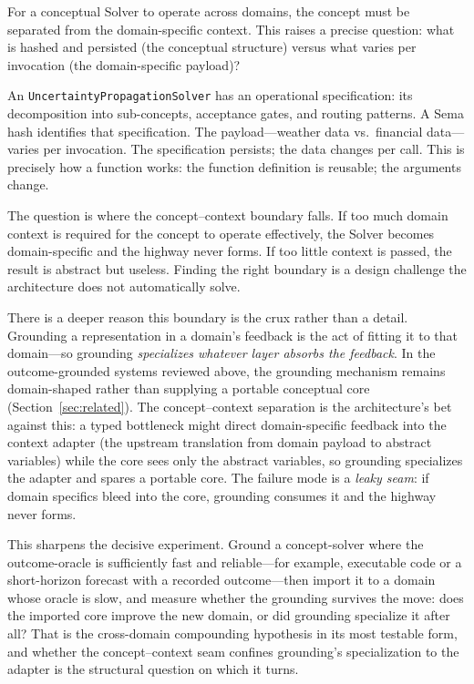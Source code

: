 \documentclass[11pt]{article}
\let\oldtexttt\texttt
\renewcommand{\texttt}[1]{\oldtexttt{\small #1}}
\begin{document}
For a conceptual Solver to operate across domains, the concept must be separated from the domain-specific context. This raises a precise question: what is hashed and persisted (the conceptual structure) versus what varies per invocation (the domain-specific payload)?

An \texttt{UncertaintyPropagationSolver} has an operational specification: its decomposition into sub-concepts, acceptance gates, and routing patterns. A Sema hash identifies that specification. The payload---weather data vs.\ financial data---varies per invocation. The specification persists; the data changes per call. This is precisely how a function works: the function definition is reusable; the arguments change.

The question is where the concept--context boundary falls. If too much domain context is required for the concept to operate effectively, the Solver becomes domain-specific and the highway never forms. If too little context is passed, the result is abstract but useless. Finding the right boundary is a design challenge the architecture does not automatically solve.

There is a deeper reason this boundary is the crux rather than a detail. Grounding a representation in a domain's feedback is the act of fitting it to that domain---so grounding \emph{specializes whatever layer absorbs the feedback}. In the outcome-grounded systems reviewed above, the grounding mechanism remains domain-shaped rather than supplying a portable conceptual core (Section~\ref{sec:related}). The concept--context separation is the architecture's bet against this: a typed bottleneck might direct domain-specific feedback into the context adapter (the upstream translation from domain payload to abstract variables) while the core sees only the abstract variables, so grounding specializes the adapter and spares a portable core. The failure mode is a \emph{leaky seam}: if domain specifics bleed into the core, grounding consumes it and the highway never forms.

This sharpens the decisive experiment. Ground a concept-solver where the outcome-oracle is sufficiently fast and reliable---for example, executable code or a short-horizon forecast with a recorded outcome---then import it to a domain whose oracle is slow, and measure whether the grounding survives the move: does the imported core improve the new domain, or did grounding specialize it after all? That is the cross-domain compounding hypothesis in its most testable form, and whether the concept--context seam confines grounding's specialization to the adapter is the structural question on which it turns.
\end{document}
